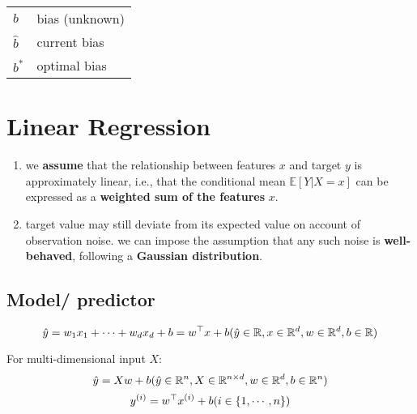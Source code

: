 \begin{table}[H]
\begin{minipage}[t]{0.49\linewidth}
\begin{customTableWrapper}{1.3}
\begin{table}[H]
\begin{tabular}{|l l|}
                \hline
        
                $b$ & bias (unknown) \\
                $\hat{b}$ & current bias \\
                $b^\ast$ & optimal bias \\
        
                \hline

            \end{tabular}
        \end{table}
        \end{customTableWrapper}
    \end{minipage}
\end{table}


\section{Linear Regression \cite{dnn-1}} \label{Linear Regression}

\begin{enumerate}[itemsep=0.15cm]
    \item we \textbf{assume} that the relationship between features $x$ and target $y$ is approximately linear, i.e., that the conditional mean $\mathbb{E}[Y | X = x]$ can be expressed as a \textbf{weighted sum of the features} $x$.

    \item target value may still deviate from its expected value on account of observation noise. we can impose the assumption that any such noise is \textbf{well-behaved}, following a \textbf{Gaussian distribution}.

\end{enumerate}

\subsection*{Model/ predictor \cite{dnn-1}}
\[
    \hfill
    \hat{y} = w_1x_1 + \cdots + w_dx_d + b
    = w^\top x + b
    \hfill
    (
        \hat{y} \in \mathbb{R},
        x \in \mathbb{R}^d ,
        w \in \mathbb{R}^d,
        b \in \mathbb{R}
    )
\]
    

\noindent
For multi-dimensional input $X$:
\[
    \hfill
    \hat{y} = Xw + b
    \hfill
    (
        \hat{y} \in \mathbb{R}^n,
        X \in \mathbb{R}^{n\times d}, 
        w \in \mathbb{R}^d,
        b \in \mathbb{R}^n
    )
\]
\[
    \hfill
    y^{(i)} = w^\top x^{(i)} + b
    \hfill
    (i \in \dCurlyBrac{1,\cdots,n})
\]

